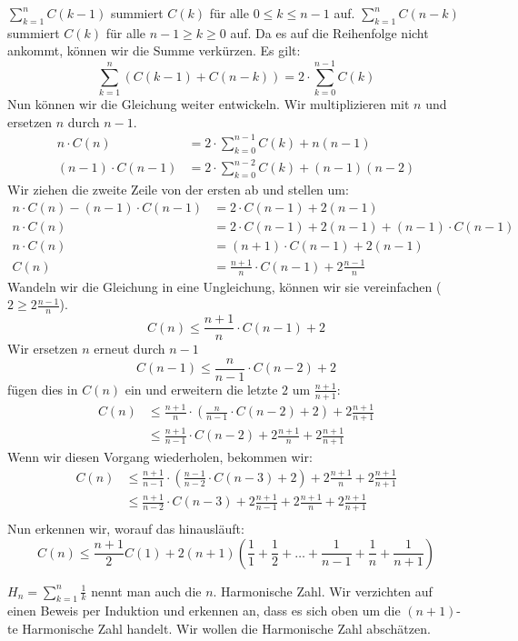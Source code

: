 \begin{Lza}[Quicksort]
$\sum_{k=1}^{n} C(k-1)$ summiert $C(k)$ für alle $0 \le k \le n-1$ auf. $\sum_{k=1}^{n} C(n-k)$ summiert $C(k)$ für alle $n-1 \ge k \ge 0$ auf. Da es auf die Reihenfolge nicht ankommt, können wir die Summe verkürzen. Es gilt:
\[\sum_{k=1}^{n} \left( C(k-1) + C(n-k)\right)  = 2 \cdot \sum_{k=0}^{n-1} C(k)\]
Nun können wir die Gleichung weiter entwickeln. Wir multiplizieren mit $n$ und ersetzen $n$ durch $n-1$.
\begin{align*}
  n \cdot C(n) &= 2 \cdot \sum_{k=0}^{n-1} C(k) + n(n-1)\\
  (n-1) \cdot C(n-1) &= 2 \cdot \sum_{k=0}^{n-2} C(k) + (n-1)(n-2)
\end{align*}
Wir ziehen die zweite Zeile von der ersten ab und stellen um:
\begin{align*}
n \cdot C(n) - (n-1) \cdot C(n-1) &= 2 \cdot C(n-1) + 2(n-1)\\
n \cdot C(n) &= 2 \cdot C(n-1) + 2(n-1) +(n-1) \cdot C(n-1)\\
n \cdot C(n) &= (n+1) \cdot C(n-1) + 2(n-1)\\
C(n) &= \frac{n+1}{n} \cdot C(n-1) + 2\frac{n-1}{n}
\end{align*}
Wandeln wir die Gleichung in eine Ungleichung, können wir sie vereinfachen ($2 \ge 2 \frac{n-1}{n}$).
\[ C(n) \le \frac{n+1}{n} \cdot C(n-1) + 2 \]
Wir ersetzen $n$ erneut durch $n-1$
\[ C(n-1) \le \frac{n}{n-1} \cdot C(n-2) + 2 \]
fügen dies in $C(n)$ ein und erweitern die letzte $2$ um $\frac{n+1}{n+1}$:
\begin{align*}
  C(n) &\le \frac{n+1}{n} \cdot \left( \frac{n}{n-1} \cdot C(n-2) + 2 \right) + 2 \frac{n+1}{n+1}\\
       &\le \frac{n+1}{n-1} \cdot C(n-2) + 2 \frac{n+1}{n} + 2 \frac{n+1}{n+1}
\end{align*}
Wenn wir diesen Vorgang wiederholen, bekommen wir:
\begin{align*}
  C(n) &\le \frac{n+1}{n-1} \cdot \left( \frac{n-1}{n-2} \cdot C(n-3) + 2 \right) + 2 \frac{n+1}{n} + 2 \frac{n+1}{n+1}\\
       &\le \frac{n+1}{n-2} \cdot C(n-3) + 2 \frac{n+1}{n-1} + 2 \frac{n+1}{n} + 2 \frac{n+1}{n+1}\\
\end{align*}
Nun erkennen wir, worauf das hinausläuft:
\[ C(n) \le \frac{n+1}{2} C(1) + 2(n+1) \left( \frac{1}{1} + \frac{1}{2} + \ldots + \frac{1}{n-1} + \frac{1}{n} + \frac{1}{n+1} \right) \]

$H_n = \sum_{k=1}^{n}\frac{1}{k}$ nennt man auch die $n$. Harmonische Zahl. Wir verzichten auf einen Beweis per Induktion und erkennen an, dass es sich oben um die $(n+1)$-te Harmonische Zahl handelt. Wir wollen die Harmonische Zahl abschätzen.


\end{Lza}
